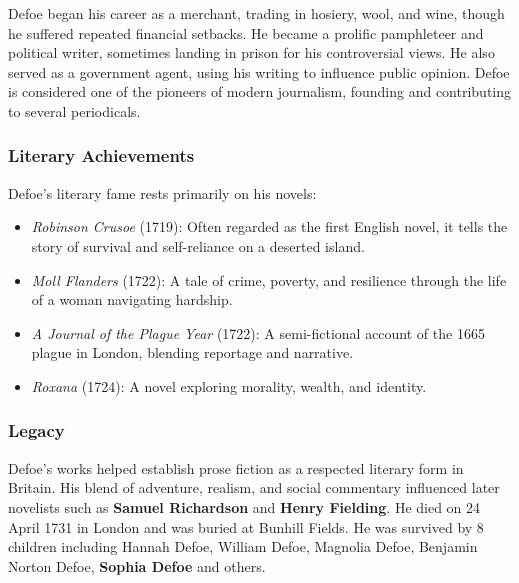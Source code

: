\documentclass[a4paper]{article}
\begin{document}
Defoe began his career as a merchant, trading in hosiery, wool, and wine, though he suffered repeated financial setbacks. He became a prolific pamphleteer and political writer, sometimes landing in prison for his controversial views. He also served as a government agent, using his writing to influence public opinion. Defoe is considered one of the pioneers of modern journalism, founding and contributing to several periodicals.



\subsubsection{Literary Achievements}

Defoe’s literary fame rests primarily on his novels:
\begin{itemize}
  \item \textit{Robinson Crusoe} (1719): Often regarded as the first English novel, it tells the story of survival and self-reliance on a deserted island.
  \item \textit{Moll Flanders} (1722): A tale of crime, poverty, and resilience through the life of a woman navigating hardship.
  \item \textit{A Journal of the Plague Year} (1722): A semi-fictional account of the 1665 plague in London, blending reportage and narrative.
  \item \textit{Roxana} (1724): A novel exploring morality, wealth, and identity.
\end{itemize}

\subsubsection{Legacy}

Defoe’s works helped establish prose fiction as a respected literary form in Britain. His blend of adventure, realism, and social commentary influenced later novelists such as \textbf{Samuel Richardson} and \textbf{Henry Fielding}. He died on 24 April 1731 in London and was buried at Bunhill Fields. He was survived by 8 children including Hannah Defoe, William Defoe, Magnolia Defoe, Benjamin Norton Defoe, \textbf{Sophia Defoe} and others.
\end{document}
